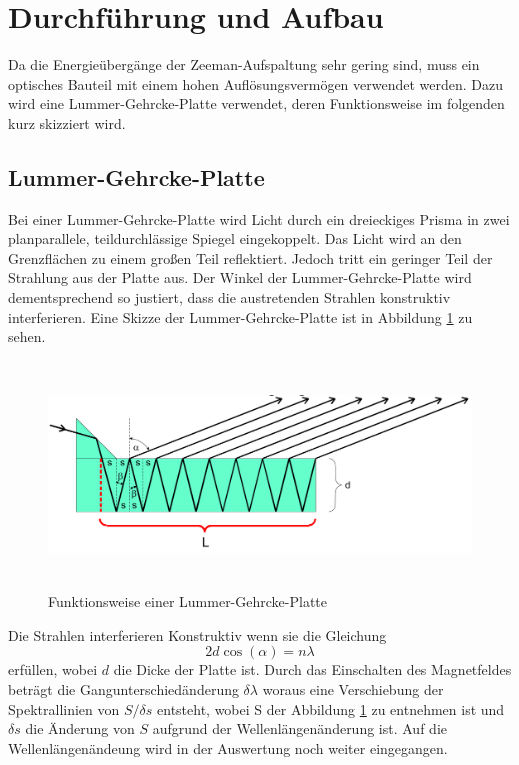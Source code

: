 \section{Durchführung und Aufbau}
\label{sec:Durchführung}
Da die Energieübergänge der Zeeman-Aufspaltung sehr gering sind, muss ein optisches Bauteil mit einem hohen Auflösungsvermögen verwendet werden. Dazu wird eine Lummer-Gehrcke-Platte verwendet, deren Funktionsweise im folgenden kurz skizziert wird.

\subsection{Lummer-Gehrcke-Platte}
Bei einer Lummer-Gehrcke-Platte wird Licht durch ein dreieckiges Prisma in zwei planparallele, teildurchlässige Spiegel eingekoppelt. Das Licht wird an den Grenzflächen zu einem großen Teil reflektiert. Jedoch tritt ein geringer Teil der Strahlung aus der Platte aus. Der Winkel der Lummer-Gehrcke-Platte wird dementsprechend so justiert, dass die austretenden Strahlen konstruktiv interferieren. Eine Skizze der Lummer-Gehrcke-Platte ist in Abbildung \ref{fig:Lum} zu sehen.

\begin{figure}[H]
  \centering
  \includegraphics[height=6cm]{Bilder/Lummer.png}
  \caption{Funktionsweise einer Lummer-Gehrcke-Platte \cite{V27}}
  \label{fig:Lum}
\end{figure}

Die Strahlen interferieren Konstruktiv wenn sie die Gleichung
\begin{equation}
  2 d \cos(\alpha) = n \lambda
\end{equation}
erfüllen, wobei $d$ die Dicke der Platte ist. Durch das Einschalten des Magnetfeldes beträgt die Gangunterschiedänderung $\delta \lambda$ woraus eine Verschiebung der Spektrallinien von $S/\delta s$ entsteht, wobei S der Abbildung \ref{fig:Lum} zu entnehmen ist und $\delta s$ die Änderung von $S$ aufgrund der Wellenlängenänderung ist. Auf die Wellenlängenändeung wird in der Auswertung noch weiter eingegangen.

